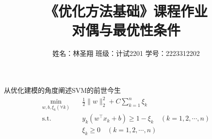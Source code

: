 \documentclass{article}
\newenvironment{problem_cn}[2][问题]{\begin{trivlist}
\item[\hskip \labelsep {\bfseries #1}\hskip \labelsep {\bfseries #2.}]}{\end{trivlist}}
\begin{document}

\title{\normalsize\bfseries 《优化方法基础》课程作业\\对偶与最优性条件}  %
\author{\normalsize 姓名：林圣翔 \quad 班级：计试2201 \quad 学号：2223312202}  %

\maketitle

\begin{problem_cn}{}
\normalsize 从优化建模的角度阐述SVM的前世今生  
\[
\begin{split}
\min_{w,b,\xi_k (\forall k)} \quad & \frac{1}{2} \| w \|_2^2 + C \sum_{k=1}^n \xi_k \\
\text{s.t.} \quad & y_k \left( w^\top x_k + b \right) \geq 1 - \xi_k \quad (k = 1,2,\cdots,n) \\
& \xi_k \geq 0 \quad (k = 1,2,\cdots,n)
\end{split}
\]
\end{problem_cn}
\end{document}
